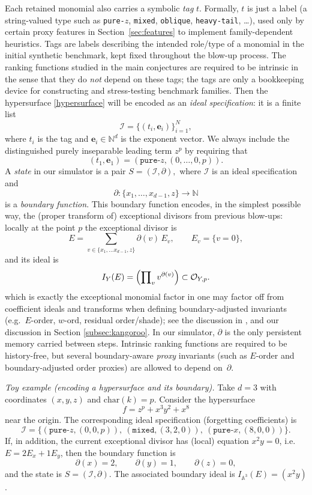 \documentclass[11pt]{amsart}
\begin{document}
Each retained monomial also carries a symbolic \emph{tag} $t$.  Formally, $t$ is just a label (a string-valued type such as \texttt{pure-$z$}, \texttt{mixed}, \texttt{oblique}, \texttt{heavy-tail}, \dots),
used only by certain proxy features in Section~\ref{sec:features} to implement family-dependent heuristics. Tags are labels describing the intended role/type of a monomial in the initial synthetic benchmark, kept fixed throughout the blow-up process.
The ranking functions studied in the main conjectures are required to be intrinsic in the sense that they do
\emph{not} depend on these tags; the tags are only a bookkeeping device for constructing and stress-testing
benchmark families. Then the hypersurface \eqref{hypersurface} will be encoded as an \emph{ideal specification}: it is a finite list
\[
\mathcal{I}=\{(t_i,\mathbf{e}_i)\}_{i=1}^N,
\]
where $t_i$ is the tag and $\mathbf{e}_i\in\mathbb{N}^d$ is the exponent vector.
We always include the distinguished purely inseparable leading term $z^p$ by requiring that
\[
(t_1,\mathbf{e}_1)=(\texttt{pure-$z$},(0,\dots,0,p)).
\] 
A \emph{state} in our simulator is a pair
$
S=(\mathcal{I},\partial),
$
where $\mathcal{I}$ is an ideal specification and
\[
\partial:\{x_1,\dots,x_{d-1},z\}\to \mathbb{N}
\]
is a \emph{boundary function}.  This boundary function encodes, in the simplest possible way, the
(proper transform of) exceptional divisors from previous blow-ups: locally at the point $p$ the exceptional divisor is 
\[
E = \sum_{v\in \{x_1,\ldots x_{d-1},z\}} \partial(v)\,E_v,
\qquad E_v=\{v=0\},
\]
and its ideal is 
\[
I_Y(E) = \Bigl(\prod\nolimits_v v^{\partial(v)}\Bigr) \subset \mathcal{O}_{Y,p}.
\]
which is exactly the exceptional monomial factor in one may factor off from coefficient ideals and transforms
when defining boundary-adjusted invariants (e.g.\ $E$-order, $w$-$\mathrm{ord}$, residual order/shade);
see the discussion in \cite{Hauser2003,Hauser2008}, and our discussion in Section \ref{subsec:kangoroo}.
In our simulator, $\partial$ is the only persistent memory carried between steps.  Intrinsic ranking
functions are required to be history-free, but several boundary-aware \emph{proxy} invariants (such as
$E$-order and boundary-adjusted order proxies) are allowed to depend on~$\partial$.


\smallskip
\noindent\emph{Toy example (encoding a hypersurface and its boundary).}
Take $d=3$ with coordinates $(x,y,z)$ and $\mathrm{char}(k)=p$.
Consider the hypersurface
\[
f = z^p + x^3y^2 + x^8
\]
near the origin.  The corresponding ideal specification (forgetting coefficients) is
\[
\mathcal{I}=\bigl\{(\texttt{pure-$z$},(0,0,p)),\ (\texttt{mixed},(3,2,0)),\ (\texttt{pure-$x$},(8,0,0))\bigr\}.
\]
If, in addition, the current exceptional divisor has (local) equation $x^2y=0$, i.e.\
$E=2E_x+1E_y$, then the boundary function is
\[
\partial(x)=2,\qquad \partial(y)=1,\qquad \partial(z)=0,
\]
and the state is $S=(\mathcal{I},\partial)$.  The associated boundary ideal is $I_{\mathbb{A}^3}(E)=(x^2y)$.
\end{document}
